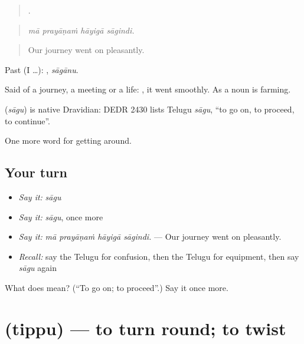 \begin{quote}
   .
\end{quote}

\begin{quote}
\emph{mā prayāṇaṁ hāyigā sāgindi.}
\end{quote}

\begin{quote}
Our journey went on pleasantly.
\end{quote}

Past (I …): , \emph{sāgānu}.

Said of a journey, a meeting or a life:  , it went smoothly. As a noun  is farming.

\begin{cousinweb}
\textbf{} (\emph{sāgu}) is native Dravidian: DEDR 2430 lists Telugu \emph{sāgu}, \textquotedblleft{}to go on, to proceed, to continue\textquotedblright{}.
\end{cousinweb}

\begin{grammarlens}[title={What you've built}]
One more word for getting around.
\end{grammarlens}

\subsection*{Your turn}
\begin{itemize}
\raggedright
  \item \emph{Say it:} \emph{sāgu}
  \item \emph{Say it:} \emph{sāgu}, once more
  \item \emph{Say it:} \emph{mā prayāṇaṁ hāyigā sāgindi.} — Our journey went on pleasantly.
  \item \emph{Recall:} say the Telugu for confusion, then the Telugu for equipment, then say \emph{sāgu} again
\end{itemize}

\begin{tcolorbox}[breakable,colback=teal!4,colframe=teal!35!black,title={Before you move on}]
What does  mean? (\textquotedblleft{}To go on; to proceed\textquotedblright{}.) Say it once more.
\end{tcolorbox}
\section[\texorpdfstring{\te{తిప్పు} (tippu)}{తిప్పు (tippu)}]{ (tippu) — to turn round; to twist}

